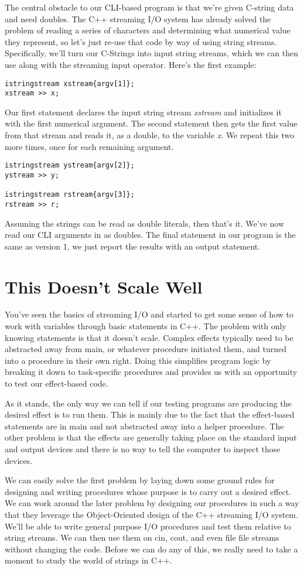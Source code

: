 \documentclass[]{tufte-handout}
\begin{document}
The central obstacle to our CLI-based program is that we're given C-string data and need doubles. The C++ streaming I/O system has already solved the problem of reading a series of characters and determining what numerical value they represent, so let's just re-use that code by way of using string streams. Specifically, we'll turn our C-Strings into input string streams, which we can then use along with the streaming input operator. Here's the first example:
\begin{verbatim}
istringstream xstream{argv[1]};
xstream >> x;
\end{verbatim}
Our first statement declares the input string stream \textit{xstream} and initializes it with the first numerical argument.  The second statement then gets the first value from that stream and reads it, as a double, to the variable \textit{x}. We repeat this two more times, once for each remaining argument.
\begin{verbatim}
istringstream ystream{argv[2]};
ystream >> y;

istringstream rstream{argv[3]};
rstream >> r;
\end{verbatim}
Assuming the strings can be read as double literals, then that's it.  We've now read our CLI arguments in as doubles. The final statement in our program is the same as version 1, we just report the results with an output statement.

\section{This Doesn't Scale Well}

You've seen the basics of streaming I/O and started to get some sense of how to work with variables through basic statements in C++. The problem with only knowing statements is that it doesn't scale. Complex effects typically need to be abstracted away from main, or whatever procedure initiated them, and turned into a procedure in their own right. Doing this simplifies program logic by breaking it down to task-specific procedures and provides us with an opportunity to test our effect-based code.

As it stands, the only way we can tell if our testing programs are producing the desired effect is to run them.  This is mainly due to the fact that the effect-based statements are in main and not abstracted away into a helper procedure. The other problem is that the effects are generally taking place on the standard input and output devices and there is no way to tell the computer to inspect those devices.

We can easily solve the first problem by laying down some ground rules for designing and writing procedures whose purpose is to carry out a desired effect. We can work around the later problem by designing our procedures in such a way that they leverage the Object-Oriented design of the C++ streaming I/O system. We'll be able to write general purpose I/O procedures and test them relative to string streams. We can then use them on cin, cout, and even file file streams without changing the code. Before we can do any of this, we really need to take a moment to study the world of strings in C++.
\end{document}
